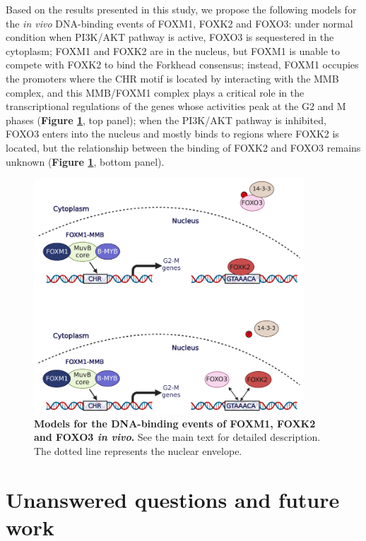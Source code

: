 Based on the results presented in this study, we propose the following models for the \textit{in vivo} DNA-binding events of FOXM1, FOXK2 and FOXO3: under normal condition when PI3K/AKT pathway is active, FOXO3 is sequestered in the cytoplasm; FOXM1 and FOXK2 are in the nucleus, but FOXM1 is unable to compete with FOXK2 to bind the Forkhead consensus; instead, FOXM1 occupies the promoters where the CHR motif is located by interacting with the MMB complex, and this MMB/FOXM1 complex plays a critical role in the transcriptional regulations of the genes whose activities peak at the G2 and M phases (\textbf{Figure \ref{fig:fig56}}, top panel); when the PI3K/AKT pathway is inhibited, FOXO3 enters into the nucleus and mostly binds to regions where FOXK2 is located, but the relationship between the binding of FOXK2 and FOXO3 remains unknown (\textbf{Figure \ref{fig:fig56}}, bottom panel).

\begin{figure}[!h]
    \centering
    \includegraphics[width=0.9\textwidth]{chapter5/figures/fig56.pdf}
    \caption[Models for the DNA-binding events of FOXM1, FOXK2 and FOXO3 \textit{in vivo}]{\textbf{Models for the DNA-binding events of FOXM1, FOXK2 and FOXO3 \textit{in vivo}.} See the main text for detailed description. The dotted line represents the nuclear envelope.}
    \label{fig:fig56}
\end{figure}

\section{Unanswered questions and future work}

